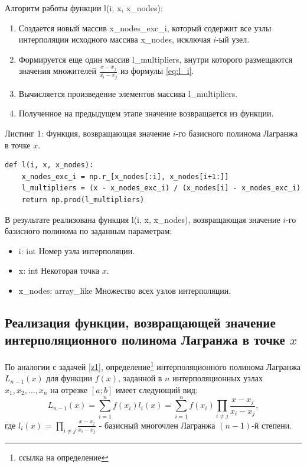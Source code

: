 Алгоритм работы функции l(i, x, x\_nodes):
\begin{enumerate}
    \item Создается новый массив x\_nodes\_exc\_i, который содержит все узлы интерполяции исходного массива x\_nodes, исключая $i$-ый узел.
    \item Формируется еще один массив l\_multipliers, внутри которого размещаются значения множителей $\frac{x-x_j}{x_i-x_j}$ из формулы \eqref{eq:l_i}.
    \item Вычисляется произведение элементов массива l\_multipliers.
    \item Полученное на предыдущем этапе значение возвращается из функции.
\end{enumerate}

Листинг 1: Функция, возвращающая значение $i$-го базисного полинома Лагранжа в точке $x$. 
\begin{lstlisting}[label={lst:listing1}]
def l(i, x, x_nodes):
    x_nodes_exc_i = np.r_[x_nodes[:i], x_nodes[i+1:]]
    l_multipliers = (x - x_nodes_exc_i) / (x_nodes[i] - x_nodes_exc_i)
    return np.prod(l_multipliers)
\end{lstlisting}

В результате реализована функция l(i, x, x\_nodes), возвращающая значение $i$-го базисного полинома по заданным параметрам:
\begin{itemize}
    \item i: int
    \quad Номер узла интерполяции.
    \item x: int
    \quad Некоторая точка $x$.
    \item x\_nodes: array\_like
    \quad Множество всех узлов интерполяции.
\end{itemize}

\subsection{Реализация функции, возвращающей значение интерполяционного полинома Лагранжа в точке $x$}
\label{z2}

По аналогии с задачей \ref{z1}, определение\footnote{ссылка на определение} интерполяционного полинома Лагранжа $L_{n-1}(x)$ для функции $f(x)$, заданной в $n$ интерполяционных узлах $x_1, x_2,...,x_n$ на отрезке $[a;b]$ имеет следующий вид:
\begin{equation}
    L_{n-1}(x) = \sum_{i=1}^{n}f(x_i)l_i(x) = \sum_{i=1}^{n}f(x_i)\prod_{i \ne j}\frac{x-x_j}{x_i-x_j},
\label{eq:L}
\end{equation}
где $l_i(x)$ = $\prod_{i \ne j}\frac{x-x_j}{x_i-x_j}$ - базисный многочлен Лагранжа $(n-1)$-й степени.

